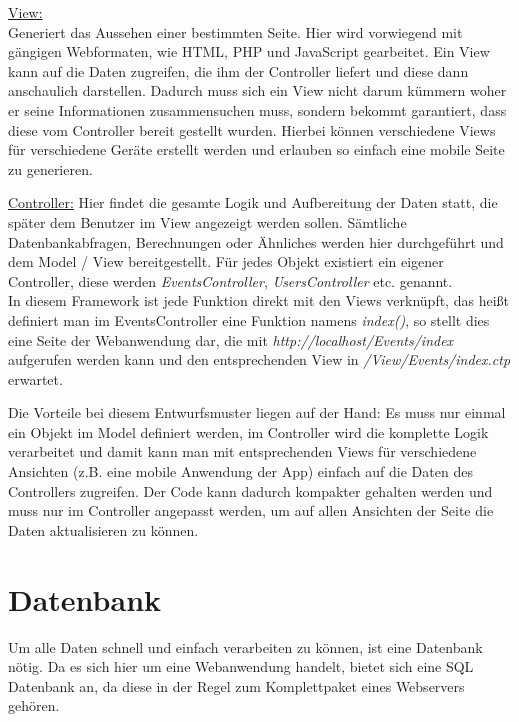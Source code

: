 \underline{View:}\\
Generiert das Aussehen einer bestimmten Seite. Hier wird vorwiegend mit gängigen Webformaten, wie HTML, PHP und JavaScript gearbeitet. Ein View kann auf die Daten zugreifen, die ihm der Controller liefert und diese dann anschaulich darstellen. Dadurch muss sich ein View nicht darum kümmern woher er seine Informationen zusammensuchen muss, sondern bekommt garantiert, dass diese vom Controller bereit gestellt wurden. Hierbei können verschiedene Views für verschiedene Geräte erstellt werden und erlauben so einfach eine mobile Seite zu generieren.

\underline{Controller:}
Hier findet die gesamte Logik und Aufbereitung der Daten statt, die später dem Benutzer im View angezeigt werden sollen. Sämtliche Datenbankabfragen, Berechnungen oder Ähnliches werden hier durchgeführt und dem Model / View bereitgestellt. Für jedes Objekt existiert ein eigener Controller, diese werden \emph{EventsController}, \emph{UsersController} etc. genannt. \\
In diesem Framework ist jede Funktion direkt mit den Views verknüpft, das heißt definiert man im EventsController eine Funktion namens \emph{index()}, so stellt dies eine Seite der Webanwendung dar, die mit \emph{http://localhost/Events/index} aufgerufen werden kann und den entsprechenden View in \emph{/View/Events/index.ctp} erwartet.\par

Die Vorteile bei diesem Entwurfsmuster liegen auf der Hand: Es muss nur einmal ein Objekt im Model definiert werden, im Controller wird die komplette Logik verarbeitet und damit kann man mit entsprechenden Views für verschiedene Ansichten (z.B. eine mobile Anwendung der App) einfach auf die Daten des Controllers zugreifen. Der Code kann dadurch kompakter gehalten werden und muss nur im Controller angepasst werden, um auf allen Ansichten der Seite die Daten aktualisieren zu können.


\section{Datenbank}
Um alle Daten schnell und einfach verarbeiten zu können, ist eine Datenbank nötig. Da es sich hier um eine Webanwendung handelt, bietet sich eine SQL Datenbank an, da diese in der Regel zum Komplettpaket eines Webservers gehören.\par

